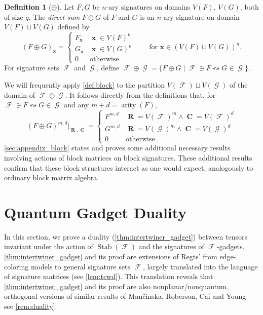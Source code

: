 \documentclass{article}
\theoremstyle{remark}
\theoremstyle{definition}
\newtheorem{definition}{Definition}[section]
\DeclareMathOperator{\arity}{arity}
\DeclareMathOperator{\vx}{\mathbf{x}}
\DeclareMathOperator{\vr}{\mathbf{R}}
\DeclareMathOperator{\vc}{\mathbf{C}}
\DeclareMathOperator{\fc}{\mathcal{F}}
\DeclareMathOperator{\gc}{\mathcal{G}}
\DeclareMathOperator{\stab}{Stab}
\begin{document}
\begin{definition}[$\oplus$]
\label{def:oplus-f-g}
    Let $F,G$ be $n$-ary signatures on domains $V(F)$, $V(G)$, both of size $q$.
    The \emph{direct sum} $F \oplus G$ of $F$ and $G$ is an
    $n$-ary signature on domain $V(F) \sqcup V(G)$ defined by
    \[
        (F \oplus G)_{\vx} = \begin{cases} 
            F_{\vx} & \vx \in V(F)^n \\
            G_{\vx} & \vx \in V(G)^n \\
            0 & \text{otherwise}
        \end{cases}
        \qquad\text{for } \mathbf{x} \in (V(F) \sqcup V(G))^n.
    \]
    For signature sets $\fc$ and $\gc$, define 
    $\fc \oplus \gc = \{F \oplus G \mid \fc \ni F \leftrightsquigarrow G \in \gc\}$.
\end{definition}
We will frequently apply \autoref{def:block} to the partition $V(\fc) \sqcup V(\gc)$ of the domain
of $\fc\oplus\gc$.
It follows directly from the definitions that, for $\fc \ni F \leftrightsquigarrow G \in \gc$ and any 
$m+d = \arity(F)$,
\begin{equation}
    (F \oplus G)^{m,d}|_{\vr,\vc} = 
    \begin{cases}
        F^{m,d} & \vr = V(\fc)^m \wedge \vc = V(\fc)^d \\ G^{m,d} & \vr = V(\gc)^m \wedge \vc = V(\gc)^d \\ 0 & \text{otherwise}.
    \end{cases}
    \label{eq:oplus_index}
\end{equation}
\autoref{sec:appendix_block} states and proves some additional necessary results involving 
actions of block matrices on block signatures.
These additional results confirm that these block structures interact as
one would expect, analogously to ordinary block matrix algebra.
 \section{Quantum Gadget Duality}
\label{sec:duality}
In this section, we prove a duality (\autoref{thm:intertwiner_gadget}) between tensors invariant
under the action of $\stab(\fc)$ and the signatures of $\fc$-gadgets. 
\autoref{thm:intertwiner_gadget} and its proof are extensions of Regts' 
\cite[Theorem 3]{regts_rank_2012}
from edge-coloring models to general signature sets $\fc$, largely translated into the language of
signature matrices (see \autoref{lem:tcwd}). This translation
reveals that \autoref{thm:intertwiner_gadget} and its proof are also nonplanar/nonquantum, orthogonal 
versions of similar results of Man\v{c}inska, Roberson, Cai and Young 
\cite{planar,cai_planar_2023,young2022equality} -- see \autoref{rem:duality}.
\end{document}
